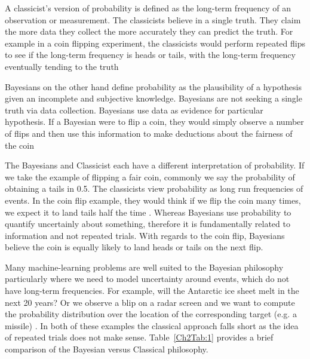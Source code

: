 A classicist's version of probability is defined as the long-term frequency of an observation or measurement. The classicists believe in a single truth. They claim the more data they collect the more accurately they can predict the truth. For example in a coin flipping experiment, the classicists would perform repeated flips to see if the long-term frequency is heads or tails, with the long-term frequency eventually tending to the truth \autocite{ambaum2012frequentist}

Bayesians on the other hand define probability as the plausibility of a hypothesis given an incomplete and subjective knowledge. Bayesians are not seeking a single truth via data collection. Bayesians use data as evidence for particular hypothesis. If a Bayesian were to flip a coin, they would simply observe a number of flips and then use this information to make deductions about the fairness of the coin \autocite{ambaum2012frequentist}

The Bayesians and Classicist each have a different interpretation of probability. If we take the example of flipping a fair coin, commonly we say the probability of obtaining a tails in 0.5. The classicists view probability as long run frequencies of events. In the coin flip example, they would think if we flip the coin many times, we expect it to land tails half the time \autocite{murphy2012machine}. Whereas Bayesians use probability to quantify uncertainly about something, therefore it is fundamentally related to information and not repeated trials. With regards to the coin flip, Bayesians believe the coin is equally likely to land heads or tails on the next flip.

Many machine-learning problems are well suited to the Bayesian philosophy particularly where we need to model uncertainty around events, which do not have long-term frequencies. For example, will the Antarctic ice sheet melt in the next 20 years? Or we observe a blip on a radar screen and we want to compute the probability distribution over the location of the corresponding target (e.g. a missile) \autocite{barberBRML2012}. In both of these examples the classical approach falls short as the idea of repeated trials does not make sense. Table~\ref{Ch2Tab:1} provides a brief comparison of the Bayesian versus Classical philosophy.


